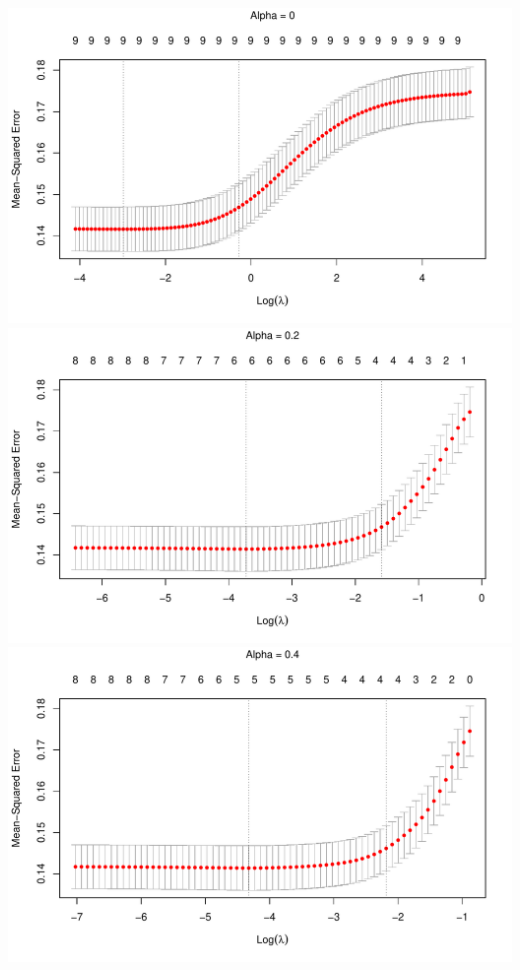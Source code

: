 \documentclass[
]{article}
\begin{document}
\includegraphics{A2_files/figure-latex/unnamed-chunk-7-1.pdf}
\includegraphics{A2_files/figure-latex/unnamed-chunk-7-2.pdf}
\includegraphics{A2_files/figure-latex/unnamed-chunk-7-3.pdf}
\end{document}
